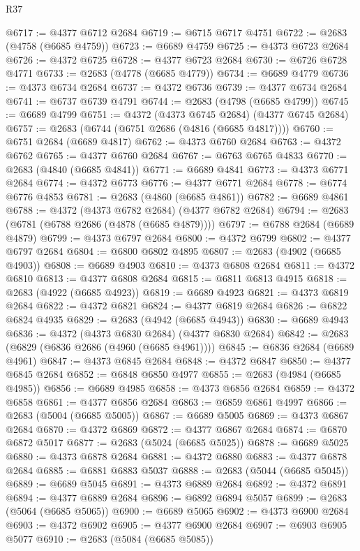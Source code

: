 \begin{lexlean}{R37}
\begin{coremodule}
@6717 := @4377 @6712 @2684
@6719 := @6715 @6717 @4751
@6722 := @2683 (@4758 (@6685 @4759))
@6723 := @6689 @4759
@6725 := @4373 @6723 @2684
@6726 := @4372 @6725
@6728 := @4377 @6723 @2684
@6730 := @6726 @6728 @4771
@6733 := @2683 (@4778 (@6685 @4779))
@6734 := @6689 @4779
@6736 := @4373 @6734 @2684
@6737 := @4372 @6736
@6739 := @4377 @6734 @2684
@6741 := @6737 @6739 @4791
@6744 := @2683 (@4798 (@6685 @4799))
@6745 := @6689 @4799
@6751 := @4372 (@4373 @6745 @2684) (@4377 @6745 @2684)
@6757 := @2683 (@6744 (@6751 @2686 (@4816 (@6685 @4817))))
@6760 := @6751 @2684 (@6689 @4817)
@6762 := @4373 @6760 @2684
@6763 := @4372 @6762
@6765 := @4377 @6760 @2684
@6767 := @6763 @6765 @4833
@6770 := @2683 (@4840 (@6685 @4841))
@6771 := @6689 @4841
@6773 := @4373 @6771 @2684
@6774 := @4372 @6773
@6776 := @4377 @6771 @2684
@6778 := @6774 @6776 @4853
@6781 := @2683 (@4860 (@6685 @4861))
@6782 := @6689 @4861
@6788 := @4372 (@4373 @6782 @2684) (@4377 @6782 @2684)
@6794 := @2683 (@6781 (@6788 @2686 (@4878 (@6685 @4879))))
@6797 := @6788 @2684 (@6689 @4879)
@6799 := @4373 @6797 @2684
@6800 := @4372 @6799
@6802 := @4377 @6797 @2684
@6804 := @6800 @6802 @4895
@6807 := @2683 (@4902 (@6685 @4903))
@6808 := @6689 @4903
@6810 := @4373 @6808 @2684
@6811 := @4372 @6810
@6813 := @4377 @6808 @2684
@6815 := @6811 @6813 @4915
@6818 := @2683 (@4922 (@6685 @4923))
@6819 := @6689 @4923
@6821 := @4373 @6819 @2684
@6822 := @4372 @6821
@6824 := @4377 @6819 @2684
@6826 := @6822 @6824 @4935
@6829 := @2683 (@4942 (@6685 @4943))
@6830 := @6689 @4943
@6836 := @4372 (@4373 @6830 @2684) (@4377 @6830 @2684)
@6842 := @2683 (@6829 (@6836 @2686 (@4960 (@6685 @4961))))
@6845 := @6836 @2684 (@6689 @4961)
@6847 := @4373 @6845 @2684
@6848 := @4372 @6847
@6850 := @4377 @6845 @2684
@6852 := @6848 @6850 @4977
@6855 := @2683 (@4984 (@6685 @4985))
@6856 := @6689 @4985
@6858 := @4373 @6856 @2684
@6859 := @4372 @6858
@6861 := @4377 @6856 @2684
@6863 := @6859 @6861 @4997
@6866 := @2683 (@5004 (@6685 @5005))
@6867 := @6689 @5005
@6869 := @4373 @6867 @2684
@6870 := @4372 @6869
@6872 := @4377 @6867 @2684
@6874 := @6870 @6872 @5017
@6877 := @2683 (@5024 (@6685 @5025))
@6878 := @6689 @5025
@6880 := @4373 @6878 @2684
@6881 := @4372 @6880
@6883 := @4377 @6878 @2684
@6885 := @6881 @6883 @5037
@6888 := @2683 (@5044 (@6685 @5045))
@6889 := @6689 @5045
@6891 := @4373 @6889 @2684
@6892 := @4372 @6891
@6894 := @4377 @6889 @2684
@6896 := @6892 @6894 @5057
@6899 := @2683 (@5064 (@6685 @5065))
@6900 := @6689 @5065
@6902 := @4373 @6900 @2684
@6903 := @4372 @6902
@6905 := @4377 @6900 @2684
@6907 := @6903 @6905 @5077
@6910 := @2683 (@5084 (@6685 @5085))

\end{coremodule}
\end{lexlean}
